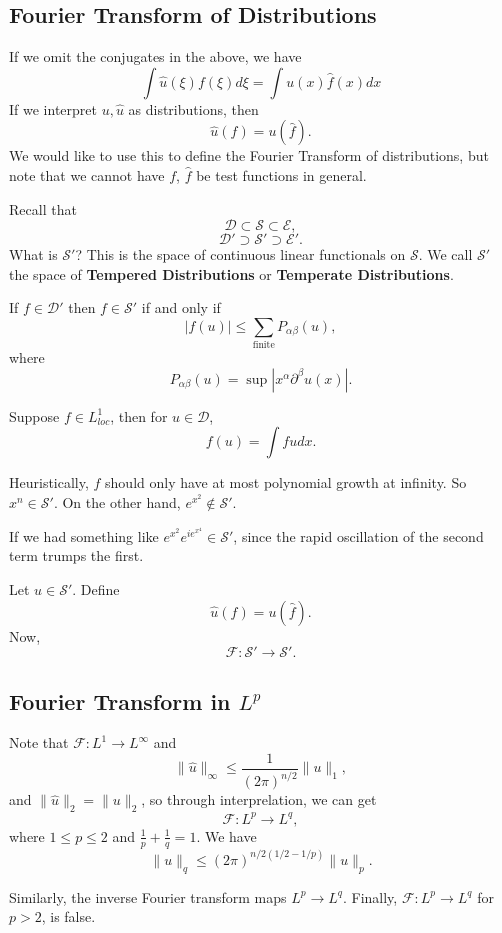 \documentclass[11pt]{scrartcl}
\renewcommand{\hat}{\widehat}
\begin{document}
\subsection{Fourier Transform of Distributions}
If we omit the conjugates in the above, we have 
$$\int \hat{u}(\xi)f(\xi)d\xi = \int u(x)\hat{f}(x)dx$$
If we interpret $u, \hat{u}$ as distributions, then 
$$\hat{u}(f) = u(\hat{f}).$$
We would like to use this to define the Fourier Transform of distributions, but note that we cannot have $f$, $\hat{f}$ be test functions in general.  

Recall that 
$$\mathcal D \subset \mathcal S \subset \mathcal E,$$
$$\mathcal D' \supset \mathcal S' \supset \mathcal E'.$$
What is $\mathcal S'$?  This is the space of continuous linear functionals on $\mathcal S$.  We call $\mathcal S'$ the space of \textbf{Tempered Distributions} or \textbf{Temperate Distributions}.

If $f \in \mathcal D'$ then $f \in \mathcal S'$ if and only if 
$$|f(u)| \le \sum_{\text{finite}} P_{\alpha \beta}(u),$$
where $$P_{\alpha \beta}(u) = \sup|x^{\alpha}\partial^\beta u(x)|.$$

Suppose $f \in L_{loc}^1$, then for $u \in \mathcal D$,
$$f(u) = \int fu dx.$$

\begin{example}
Heuristically, $f$ should only have at most polynomial growth at infinity.  So $x^n \in \mathcal S'$.  On the other hand, $e^{x^2} \not \in \mathcal S'$.  

If we had something like $e^{x^2}e^{ie^{x^4}} \in \mathcal S'$, since the rapid oscillation of the second term trumps the first.
\end{example}
\begin{definition}Let $u \in \mathcal S'$.  Define 
$$\hat{u}(f) = u(\hat{f}).$$
Now,
$$\mathcal F: \mathcal S' \to \mathcal S'.$$
\end{definition}
\subsection{Fourier Transform in $L^p$}
Note that $\mathcal F: L^1 \rightarrow L^{\infty}$ and $$\|\hat{u}\|_{\infty} \le \frac{1}{(2\pi)^{n/2}}\|u\|_1,$$
and $\| \hat{u}\|_2 = \|u\|_2$, so through interprelation, we can get 
$$\mathcal F : L^p \to L^{q},$$
where $1 \le p \le 2$ and $\frac{1}{p} + \frac{1}{q} = 1$.  We have 
$$\|u\|_{q} \le (2\pi)^{n/2(1/2 - 1/p)}\|u\|_p.$$

Similarly, the inverse Fourier transform maps $L^p \to L^q$.  Finally, $\mathcal F: L^p \to L^q$ for $p > 2$, is false. 
\end{document}
